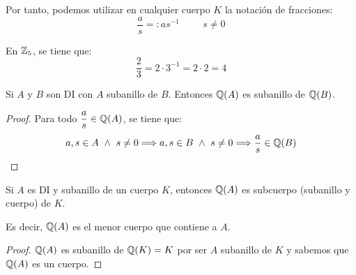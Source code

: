 Por tanto, podemos utilizar en cualquier cuerpo $K$ la notación de fracciones:
$$\dfrac{a}{s} =: as^{-1}\hspace{1cm}s \neq 0$$
\begin{ejemplo}
    En $\mathbb Z_5$, se tiene que:
    \begin{equation*}
        \frac{2}{3} = 2\cdot 3^{-1} = 2\cdot 2 = 4
    \end{equation*}
\end{ejemplo}

\begin{lema}
    Si $A$ y $B$ son DI con $A$ subanillo de $B$. Entonces $\mathbb Q(A)$ es subanillo de $\mathbb Q(B)$.
\end{lema}
\begin{proof} Para todo $\dfrac{a}{s} \in \mathbb Q(A)$, se tiene que:
    $$a,s \in A \ \land \  s \neq 0 \Longrightarrow a,s \in B \ \land \  s \neq 0 \Longrightarrow \dfrac{a}{s}
        \in \mathbb Q(B)$$
\end{proof}

\begin{lema}
    Si $A$ es DI y subanillo de un cuerpo $K$, entonces $\mathbb Q(A)$ es subcuerpo (subanillo y cuerpo) de $K$.

    Es decir, $\mathbb Q(A)$ es el menor cuerpo que contiene a $A$.
\end{lema}
\begin{proof}
    $\mathbb Q(A)$ es subanillo de $\mathbb Q(K) = K$ por ser $A$ subanillo de $K$ y sabemos que $\mathbb Q(A)$ es un cuerpo.
\end{proof}

